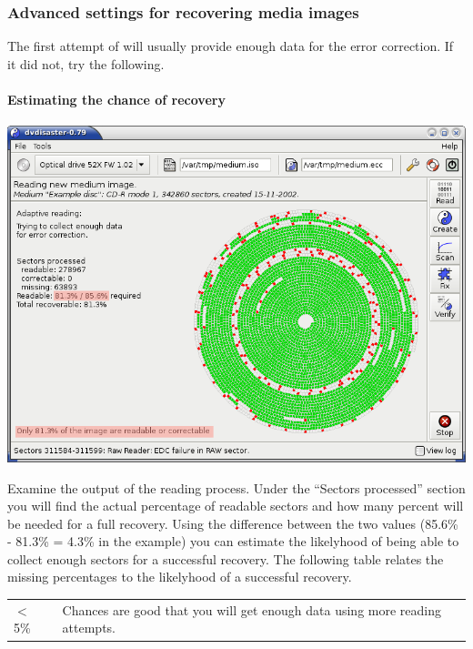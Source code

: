 \newpage
\subsubsection{Advanced settings for recovering media images}
\label{howto-recover-settings-adv}

The first attempt of  will
usually provide enough data for the error correction. If it did not, try the following.

\vspace*{-2mm}

\paragraph{Estimating the chance of recovery}\quad

\bigskip

\centerline{\includegraphics[width=\textwidth]{screenshots/adaptive-failure.png}}

\smallskip

Examine the output of the reading process. Under the
``Sectors processed'' section you will find the actual
percentage of readable sectors and how many percent will
be needed for a full recovery. Using the difference between
the two values (85.6\% - 81.3\% = 4.3\% in the example) you
can estimate the likelyhood of being able to collect enough
sectors for a successful recovery. The following table
relates the missing percentages to the likelyhood of a
successful recovery.

\bigskip

\colorbox{ltgreen}{
  \begin{tabular}{p{30mm}p{118mm}}
    $<$ 5\% &
    Chances are good that you will get enough data using more reading attempts. \\
\end{tabular}}

